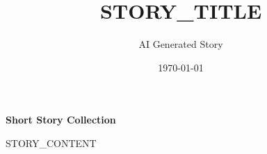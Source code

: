 \documentclass[a4paper,12pt]{article}
\title{{{STORY_TITLE}}}
\author{AI Generated Story}
\date{\today}
\begin{document}
\maketitle

\begin{center}
\Large\textbf{Short Story Collection}
\end{center}

\vspace{1cm}

{{STORY_CONTENT}}
\end{document}
